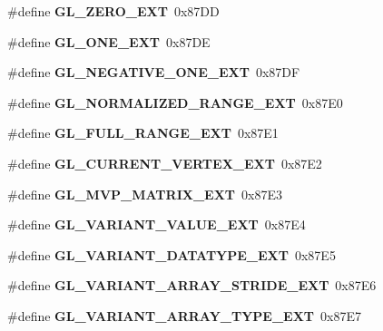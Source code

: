 \begin{DoxyCompactItemize}
\item 
\#define {\bfseries G\+L\+\_\+\+Z\+E\+R\+O\+\_\+\+E\+X\+T}~0x87\+D\+D\label{_s_d_l__opengl_8h_a67a14850ddc3df36175fa3d3fab66408}

\item 
\#define {\bfseries G\+L\+\_\+\+O\+N\+E\+\_\+\+E\+X\+T}~0x87\+D\+E\label{_s_d_l__opengl_8h_a15863742821a604db79768c476e2abaa}

\item 
\#define {\bfseries G\+L\+\_\+\+N\+E\+G\+A\+T\+I\+V\+E\+\_\+\+O\+N\+E\+\_\+\+E\+X\+T}~0x87\+D\+F\label{_s_d_l__opengl_8h_ad0b88c02bfeeffa7c1809d970e0841b6}

\item 
\#define {\bfseries G\+L\+\_\+\+N\+O\+R\+M\+A\+L\+I\+Z\+E\+D\+\_\+\+R\+A\+N\+G\+E\+\_\+\+E\+X\+T}~0x87\+E0\label{_s_d_l__opengl_8h_ad695b8f36ec789991ae23f00ac595c8b}

\item 
\#define {\bfseries G\+L\+\_\+\+F\+U\+L\+L\+\_\+\+R\+A\+N\+G\+E\+\_\+\+E\+X\+T}~0x87\+E1\label{_s_d_l__opengl_8h_af5f2fa131e97452a04102f90f3d21b77}

\item 
\#define {\bfseries G\+L\+\_\+\+C\+U\+R\+R\+E\+N\+T\+\_\+\+V\+E\+R\+T\+E\+X\+\_\+\+E\+X\+T}~0x87\+E2\label{_s_d_l__opengl_8h_a3d016e00e5d0907c2d5a20e7d4acc712}

\item 
\#define {\bfseries G\+L\+\_\+\+M\+V\+P\+\_\+\+M\+A\+T\+R\+I\+X\+\_\+\+E\+X\+T}~0x87\+E3\label{_s_d_l__opengl_8h_ab0f043774b4910ea290a0ed5b46b61a9}

\item 
\#define {\bfseries G\+L\+\_\+\+V\+A\+R\+I\+A\+N\+T\+\_\+\+V\+A\+L\+U\+E\+\_\+\+E\+X\+T}~0x87\+E4\label{_s_d_l__opengl_8h_a2d0a93cac41e7c5b5f7b42b09cabd7ed}

\item 
\#define {\bfseries G\+L\+\_\+\+V\+A\+R\+I\+A\+N\+T\+\_\+\+D\+A\+T\+A\+T\+Y\+P\+E\+\_\+\+E\+X\+T}~0x87\+E5\label{_s_d_l__opengl_8h_a769c6fa1de10e2a6f3149fd8c7620157}

\item 
\#define {\bfseries G\+L\+\_\+\+V\+A\+R\+I\+A\+N\+T\+\_\+\+A\+R\+R\+A\+Y\+\_\+\+S\+T\+R\+I\+D\+E\+\_\+\+E\+X\+T}~0x87\+E6\label{_s_d_l__opengl_8h_aec75c3d351fe183d56e80da493977685}

\item 
\#define {\bfseries G\+L\+\_\+\+V\+A\+R\+I\+A\+N\+T\+\_\+\+A\+R\+R\+A\+Y\+\_\+\+T\+Y\+P\+E\+\_\+\+E\+X\+T}~0x87\+E7\label{_s_d_l__opengl_8h_a3ed967437e493e21f096c2922d2da473}


\end{DoxyCompactItemize}
